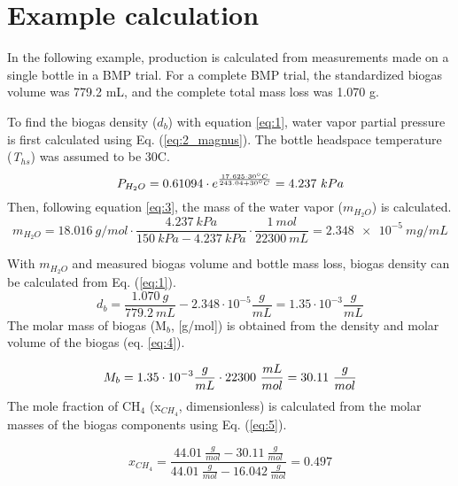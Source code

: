 \documentclass[]{article}
\begin{document}
\section{Example calculation} \label{s_example}
In the following example,  production is calculated from measurements made on a single bottle in a BMP trial.
For a complete BMP trial, the standardized biogas volume was 779.2 mL, and the complete total mass loss was 1.070 g.

To find the biogas density ($d_b$) with equation \ref{eq:1}, water vapor partial pressure is first calculated using Eq. (\ref{eq:2_magnus}). 
The bottle headspace temperature (\textit{T}$_{hs}$) was assumed to be 30\degree C.
\begin{equation*}
   P_{H_2O} = 0.61094 \cdot e^{\frac{17.625 \cdot 30 \degree C}{243.04 + 30 \degree C}} = 4.237\ kPa
\end{equation*}
Then, following equation \ref{eq:3}, the mass of the water vapor ($m_{H_2O}$) is calculated.
\begin{equation*}
  m_{H_2O} = \SI{18.016} {g/mol} \cdot \frac{\SI{4.237}{kPa}}{\SI{150}{kPa} - \SI{4.237}{kPa}} \cdot \frac{\SI{1}{mol}}{\SI{22300}{mL}} = \SI{2.348e-5}{mg/mL}
\end{equation*}

With $m_{H_2O}$ and measured biogas volume and bottle mass loss, biogas density can be calculated from Eq. (\ref{eq:1}).
\begin{equation*}
  d_b=\frac{1.070\ g}{779.2\ mL} - 2.348 \cdot 10^{-5} \frac{g}{mL} = 1.35 \cdot 10^{-3} \frac{g}{mL}
\end{equation*}
The molar mass of biogas (M$_b$, [g/mol]) is obtained from the density and molar volume of the biogas (eq. \ref{eq:4}).

\begin{equation*}
  \centering
  M_b= 1.35 \cdot 10^{-3} \frac{g}{mL} \cdot 22300\ \frac{mL}{mol} = 30.11\ \frac{g}{mol}
\end{equation*}
The mole fraction of CH$_4$ (x$_{CH_4}$, dimensionless) is calculated from the molar masses of the biogas components using Eq. (\ref{eq:5}). 

\begin{equation*}
  x_{CH_4}=\frac{44.01\ \frac{g}{mol}-30.11\ \frac{g}{mol}}{44.01\ \frac{g}{mol}-16.042\ \frac{g}{mol}} = 0.497
\end{equation*}
\end{document}
